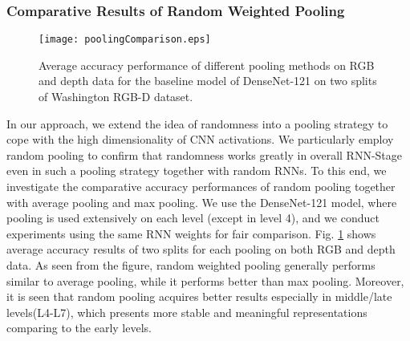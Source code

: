 \documentclass[10pt,journal,compsoc]{IEEEtran}
\begin{document}
\subsubsection{Comparative Results of Random Weighted Pooling} \label{sec.exp.ma.poolingPerformances}
\begin{figure}
	\centering
	\texttt{[image: poolingComparison.eps]}
	\caption{Average accuracy performance of different pooling methods on RGB and depth data for the baseline model of DenseNet-121 on two splits of Washington RGB-D dataset.}
	\label{fig:poolingComparison}
\end{figure}
In our approach, we extend the idea of randomness into a pooling strategy to cope with the high dimensionality of CNN activations. We particularly employ random pooling to confirm that randomness works greatly in overall RNN-Stage even in such a pooling strategy together with random RNNs. To this end, we investigate the comparative accuracy performances of random pooling together with average pooling and max pooling. We use the DenseNet-121 model, where pooling is used extensively on each level (except in level 4), and we conduct experiments using the same RNN weights for fair comparison. Fig. \ref{fig:poolingComparison} shows average accuracy results of two splits for each pooling on both RGB and depth data. As seen from the figure, random weighted pooling generally performs similar to average pooling, while it performs better than max pooling. Moreover, it is seen that random pooling acquires better results especially in middle/late levels(L4-L7), which presents more stable and meaningful representations comparing to the early levels.
\end{document}
